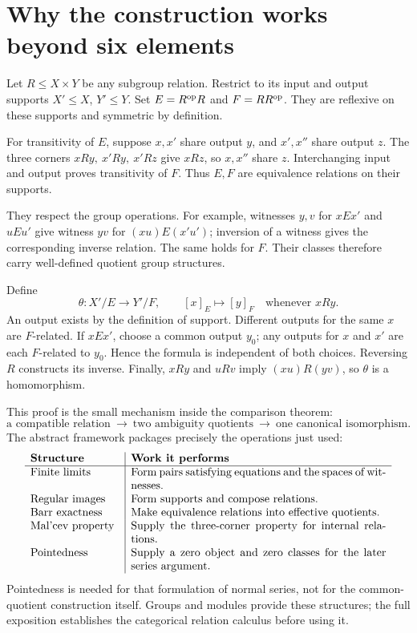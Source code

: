 
\clearpage
\section{Why the construction works beyond six elements}\label{c:general}
Let \(R\leq X\times Y\) be any subgroup relation. Restrict to its input
and output supports \(X'\leq X\), \(Y'\leq Y\). Set
\(E=R^{\mathrm{op}} R\) and \(F=RR^{\mathrm{op}}\).
They are reflexive on these supports and symmetric by definition.

For transitivity of \(E\), suppose \(x,x'\) share output \(y\), and
\(x',x''\) share output \(z\). The three corners
\(xRy,\ x'Ry,\ x'Rz\) give \(xRz\), so \(x,x''\) share \(z\).
Interchanging input and output proves transitivity of \(F\).
Thus \(E,F\) are equivalence relations on their supports.

They respect the group operations. For example, witnesses \(y,v\) for
\(xEx'\) and \(uEu'\) give witness \(yv\) for
\((xu)E(x'u')\); inversion of a witness gives the corresponding inverse
relation. The same holds for \(F\). Their classes therefore carry
well-defined quotient group structures.

Define
\[
 \theta:X'/E\longrightarrow Y'/F,\qquad [x]_E\longmapsto[y]_F
 \quad\text{whenever }xRy.
\]
An output exists by the definition of support. Different outputs for the
same \(x\) are \(F\)-related. If \(xEx'\), choose a common output \(y_0\);
any outputs for \(x\) and \(x'\) are each \(F\)-related to \(y_0\).
Hence the formula is independent of both choices. Reversing \(R\)
constructs its inverse. Finally, \(xRy\) and \(uRv\) imply
\((xu)R(yv)\), so \(\theta\) is a homomorphism.

This proof is the small mechanism inside the comparison theorem:
\[
 \boxed{\text{a compatible relation}
 \ \longrightarrow\ \text{two ambiguity quotients}
 \ \longrightarrow\ \text{one canonical isomorphism}.}
\]
The abstract framework packages precisely the operations just used:
\[
\begin{array}{p{0.23\linewidth}|p{0.66\linewidth}}
 \textbf{Structure}&\textbf{Work it performs}\\ \hline
 Finite limits&Form pairs satisfying equations and the spaces of witnesses.\\
 Regular images&Form supports and compose relations.\\
 Barr exactness&Make equivalence relations into effective quotients.\\
 Mal'cev property&Supply the three-corner property for internal relations.\\
 Pointedness&Supply a zero object and zero classes for the later series argument.
\end{array}
\]
Pointedness is needed for that formulation of normal series, not for
the common-quotient construction itself. Groups and modules provide these
structures; the full exposition establishes the categorical relation
calculus before using it.


